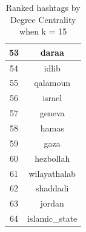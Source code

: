 \documentclass[conference]{IEEEtran}
\begin{document}
\begin{table}[ht]
\begin{tabular} { | c | c | }
            \hline
            53   & daraa           \\
            \hline
            54   & idlib           \\
            \hline
            55   & qalamoun        \\
            \hline
            56   & israel          \\
            \hline
            57   & geneva          \\
            \hline
            58   & hamas           \\
            \hline
            59   & gaza            \\
            \hline
            60   & hezbollah       \\
            \hline
            61   & wilayathalab    \\
            \hline
            62   & shaddadi        \\
            \hline
            63   & jordan          \\
            \hline
            64   & islamic\_state  \\
            \hline

        \end{tabular}
        \caption {Ranked hashtags by Degree Centrality when k = 15}
        \label{tab:hashtag-ranks-k-15}
    \end{table}
\end{document}
